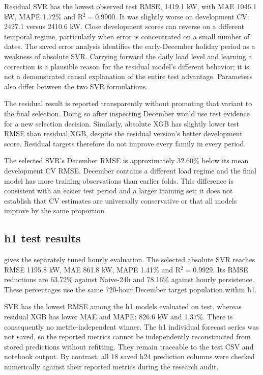 Residual SVR has the lowest observed test RMSE, \num{1419.1} kW, with MAE \num{1046.1} kW, MAPE \num{1.72}\% and R$^2=\num{0.9900}$. It was slightly worse on development CV: \num{2427.1} versus \num{2410.6} kW. Close development scores can reverse on a different temporal regime, particularly when error is concentrated on a small number of dates. The saved error analysis identifies the early-December holiday period as a weakness of absolute SVR. Carrying forward the daily load level and learning a correction is a plausible reason for the residual model's different behavior; it is not a demonstrated causal explanation of the entire test advantage. Parameters also differ between the two SVR formulations.

The residual result is reported transparently without promoting that variant to the final selection. Doing so after inspecting December would use test evidence for a new selection decision. Similarly, absolute XGB has slightly lower test RMSE than residual XGB, despite the residual version's better development score. Residual targets therefore do not improve every family in every period.

The selected SVR's December RMSE is approximately \num{32.60}\% below its mean development CV RMSE. December contains a different load regime and the final model has more training observations than earlier folds. This difference is consistent with an easier test period and a larger training set; it does not establish that CV estimates are universally conservative or that all models improve by the same proportion.

\subsection{h1 test results}
 gives the separately tuned hourly evaluation. The selected absolute SVR reaches RMSE \num{1195.8} kW, MAE \num{861.8} kW, MAPE \num{1.41}\% and R$^2=\num{0.9929}$. Its RMSE reductions are \num{63.72}\% against Naive-24h and \num{78.16}\% against hourly persistence. These percentages use the same 720-hour December target population within h1.


SVR has the lowest RMSE among the h1 models evaluated on test, whereas residual XGB has lower MAE and MAPE: \num{826.6} kW and \num{1.37}\%. There is consequently no metric-independent winner. The h1 individual forecast series was not saved, so the reported metrics cannot be independently reconstructed from stored predictions without refitting. They remain traceable to the test CSV and notebook output. By contrast, all 18 saved h24 prediction columns were checked numerically against their reported metrics during the research audit.

